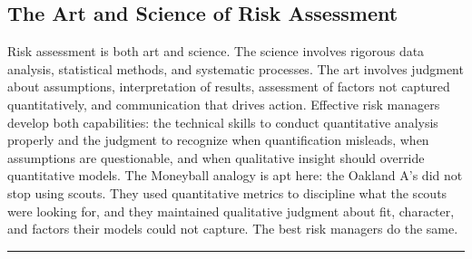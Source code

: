 \documentclass[11pt,openany]{book}
\begin{document}
\subsection{The Art and Science of Risk Assessment}
\label{subsec:art-science}

Risk assessment is both art and science. The science involves rigorous data
analysis, statistical methods, and systematic processes. The art involves
judgment about assumptions, interpretation of results, assessment of factors
not captured quantitatively, and communication that drives action. Effective
risk managers develop both capabilities: the technical skills to conduct
quantitative analysis properly and the judgment to recognize when quantification
misleads, when assumptions are questionable, and when qualitative insight should
override quantitative models. The Moneyball analogy is apt here: the Oakland
A's did not stop using scouts. They used quantitative metrics to discipline what
the scouts were looking for, and they maintained qualitative judgment about fit,
character, and factors their models could not capture. The best risk managers
do the same.

\begin{center}\rule{0.5\linewidth}{0.5pt}\end{center}
\end{document}
